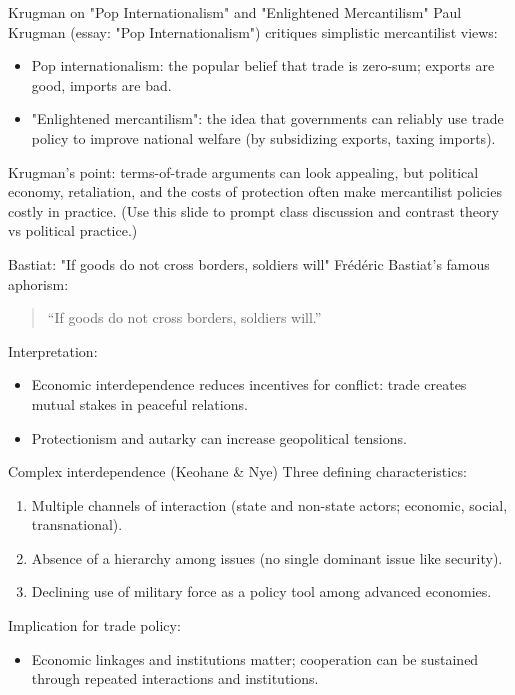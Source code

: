\documentclass[notes,11pt, aspectratio=169, xcolor=table]{beamer}
\begin{document}
\begin{frame}{Krugman on "Pop Internationalism" and "Enlightened Mercantilism"}
  Paul Krugman (essay: "Pop Internationalism") critiques simplistic mercantilist views:
  \begin{itemize}
    \item Pop internationalism: the popular belief that trade is zero-sum; exports are good, imports are bad.
    \item "Enlightened mercantilism": the idea that governments can reliably use trade policy to improve national welfare (by subsidizing exports, taxing imports).
  \end{itemize}
  Krugman's point: terms-of-trade arguments can look appealing, but political economy, retaliation, and the costs of protection often make mercantilist policies costly in practice.
  (Use this slide to prompt class discussion and contrast theory vs political practice.)
\end{frame}

\begin{frame}{Bastiat: "If goods do not cross borders, soldiers will"}
  Frédéric Bastiat's famous aphorism:
  \begin{quote}
  ``If goods do not cross borders, soldiers will.''
  \end{quote}
  Interpretation:
  \begin{itemize}
    \item Economic interdependence reduces incentives for conflict: trade creates mutual stakes in peaceful relations.
    \item Protectionism and autarky can increase geopolitical tensions.
  \end{itemize}
\end{frame}

\begin{frame}{Complex interdependence (Keohane \& Nye)}
  Three defining characteristics:
  \begin{enumerate}
    \item Multiple channels of interaction (state and non-state actors; economic, social, transnational).
    \item Absence of a hierarchy among issues (no single dominant issue like security).
    \item Declining use of military force as a policy tool among advanced economies.
  \end{enumerate}
  Implication for trade policy:
  \begin{itemize}
    \item Economic linkages and institutions matter; cooperation can be sustained through repeated interactions and institutions.
  \end{itemize}
\end{frame}
\end{document}
